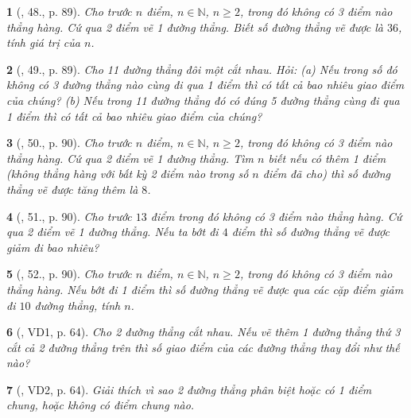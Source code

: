\documentclass{article}
\newtheorem{baitoan}{}
\begin{document}
\begin{baitoan}[\cite{Tuyen_Toan_6}, 48., p. 89]
	Cho trước $n$ điểm, $n\in\mathbb{N}$, $n\ge2$, trong đó không có 3 điểm nào thẳng hàng. Cứ qua 2 điểm vẽ 1 đường thẳng. Biết số đường thẳng vẽ được là $36$, tính giá trị của $n$.
\end{baitoan}

\begin{baitoan}[\cite{Tuyen_Toan_6}, 49., p. 89]
	Cho 11 đường thẳng đôi một cắt nhau. Hỏi: (a) Nếu trong số đó không có 3 đường thẳng nào cùng đi qua 1 điểm thì có tất cả bao nhiêu giao điểm của chúng? (b) Nếu trong 11 đường thẳng đó có đúng 5 đường thẳng cùng đi qua 1 điểm thì có tất cả bao nhiêu giao điểm của chúng?
\end{baitoan}

\begin{baitoan}[\cite{Tuyen_Toan_6}, 50., p. 90]
	Cho trước $n$ điểm, $n\in\mathbb{N}$, $n\ge2$, trong đó không có 3 điểm nào thẳng hàng. Cứ qua 2 điểm vẽ 1 đường thẳng. Tìm $n$ biết nếu có thêm 1 điểm (không thẳng hàng với bất kỳ 2 điểm nào trong số $n$ điểm đã cho) thì số đường thẳng vẽ được tăng thêm là $8$.
\end{baitoan}

\begin{baitoan}[\cite{Tuyen_Toan_6}, 51., p. 90]
	Cho trước $13$ điểm trong đó không có 3 điểm nào thẳng hàng. Cứ qua 2 điểm vẽ 1 đường thẳng. Nếu ta bớt đi $4$ điểm thì số đường thẳng vẽ được giảm đi bao nhiêu?
\end{baitoan}

\begin{baitoan}[\cite{Tuyen_Toan_6}, 52., p. 90]
	Cho trước $n$ điểm, $n\in\mathbb{N}$, $n\ge2$, trong đó không có 3 điểm nào thẳng hàng. Nếu bớt đi 1 điểm thì số đường thẳng vẽ được qua các cặp điểm giảm đi $10$ đường thẳng, tính $n$.
\end{baitoan}

\begin{baitoan}[\cite{Binh_Toan_6_tap_2}, VD1, p. 64]
	Cho 2 đường thẳng cắt nhau. Nếu vẽ thêm 1 đường thẳng thứ 3 cắt cả 2 đường thẳng trên thì số giao điểm của các đường thẳng thay đổi như thế nào?
\end{baitoan}

\begin{baitoan}[\cite{Binh_Toan_6_tap_2}, VD2, p. 64]
	Giải thích vì sao 2 đường thẳng phân biệt hoặc có 1 điểm chung, hoặc không có điểm chung nào.
\end{baitoan}
\end{document}
